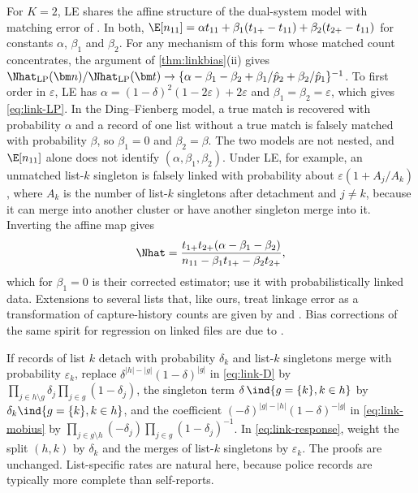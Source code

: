 \begin{remark}\label{rem:link-lit}
For $K=2$, LE shares the affine structure of the dual-system model with matching error of \citet{ding1994}. In both, $\E[n_{11}]=\alpha t_{11}+\beta_1(t_{1+}-t_{11})+\beta_2(t_{2+}-t_{11})$ for constants $\alpha$, $\beta_1$ and $\beta_2$. For any mechanism of this form whose matched count concentrates, the argument of \cref{thm:linkbias}(ii) gives $\Nhat_{\mathrm{LP}}(\bm n)/\Nhat_{\mathrm{LP}}(\bm t)\to\{\alpha-\beta_1-\beta_2+\beta_1/\hat p_2+\beta_2/\hat p_1\}^{-1}$. To first order in $\varepsilon$, LE has $\alpha=(1-\delta)^2(1-2\varepsilon)+2\varepsilon$ and $\beta_1=\beta_2=\varepsilon$, which gives \eqref{eq:link-LP}. In the Ding--Fienberg model, a true match is recovered with probability $\alpha$ and a record of one list without a true match is falsely matched with probability $\beta$, so $\beta_1=0$ and $\beta_2=\beta$. The two models are not nested, and $\E[n_{11}]$ alone does not identify $(\alpha,\beta_1,\beta_2)$. Under LE, for example, an unmatched list-$k$ singleton is falsely linked with probability about $\varepsilon(1+A_j/A_k)$, where $A_k$ is the number of list-$k$ singletons after detachment and $j\ne k$, because it can merge into another cluster or have another singleton merge into it. Inverting the affine map gives
\[
  \Nhat=\frac{t_{1+}t_{2+}(\alpha-\beta_1-\beta_2)}{n_{11}-\beta_1t_{1+}-\beta_2t_{2+}},
\]
which for $\beta_1=0$ is their corrected estimator; \citet{diconsiglio2015} use it with probabilistically linked data. Extensions to several lists that, like ours, treat linkage error as a transformation of capture-history counts are given by \citet{ding1996} and \citet{diconsiglio2018}. Bias corrections of the same spirit for regression on linked files are due to \citet{lahiri2005}.
\end{remark}

\begin{remark}\label{rem:link-listspecific}
If records of list $k$ detach with probability $\delta_k$ and list-$k$ singletons merge with probability $\varepsilon_k$, replace $\delta^{|h|-|g|}(1-\delta)^{|g|}$ in \eqref{eq:link-D} by $\prod_{j\in h\setminus g}\delta_j\prod_{j\in g}(1-\delta_j)$, the singleton term $\delta\,\ind{g=\{k\},k\in h}$ by $\delta_k\ind{g=\{k\},k\in h}$, and the coefficient $(-\delta)^{|g|-|h|}(1-\delta)^{-|g|}$ in \eqref{eq:link-mobius} by $\prod_{j\in g\setminus h}(-\delta_j)\prod_{j\in g}(1-\delta_j)^{-1}$. In \eqref{eq:link-response}, weight the split $(h,k)$ by $\delta_k$ and the merges of list-$k$ singletons by $\varepsilon_k$. The proofs are unchanged. List-specific rates are natural here, because police records are typically more complete than self-reports.
\end{remark}

